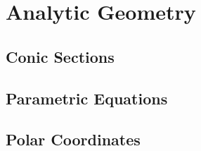 \chapter{Analytic Geometry}

\section{Conic Sections}

\section{Parametric Equations}

\section{Polar Coordinates}